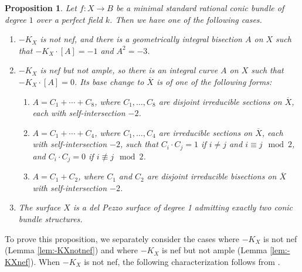 \documentclass[a4paper, 11pt, reqno]{amsart}
\numberwithin{equation}{section} \numberwithin{figure}{section}
\def \F {{\mathbb F}}
\def \P {{\mathbb P}}
\newcommand{\ra}{\rightarrow}
\newtheorem{lemma}{Lemma}
\newtheorem{proposition}[lemma]{Proposition}
\theoremstyle{definition}
\numberwithin{lemma}{section}
\begin{document}
\begin{proposition}\label{prop:classificationCB}
    Let $f \colon X \ra B$ be a minimal standard rational conic bundle of degree $1$ over a perfect field $k$. Then we have one of the following cases.
    \begin{enumerate}
        \item $-K_X$ is not nef, and there is a geometrically integral bisection $A$ on $X$ such that $-K_X \cdot [A] = -1$ and $A^2 = -3$.
        \item $-K_X$ is nef but not ample, so there is an integral curve $A$ on $X$ such that $-K_X \cdot [A] = 0$. Its base change to $\overline{X}$ is of one of the following forms:
        \begin{enumerate}
            \item $A = C_1 + \cdots + C_8$, where $C_1, \ldots, C_8$ are disjoint irreducible sections on $\overline{X}$, each with self-intersection $-2$.
        
            \item $A = C_1 + \cdots + C_4$, where $C_1, \ldots, C_4$ are irreducible sections on $\overline{X}$, each with self-intersection $-2$, such that $C_i \cdot C_j = 1$ if $i \neq j$ and $i \equiv j \mod 2$, and $C_i \cdot C_j = 0$ if $i \not \equiv j \mod 2$.

            \item $A = C_1 + C_2$, where $C_1$ and $C_2$ are disjoint irreducible bisections on $\overline{X}$ with self-intersection $-2$.
        \end{enumerate}
         \item The surface $X$ is a del Pezzo surface of degree 1 admitting exactly two conic bundle structures.
    \end{enumerate}
\end{proposition}

 To prove this proposition, we separately consider the cases where $-K_X$ is not nef (Lemma \ref{lem:-KXnotnef}) and where $-K_X$ is nef but not ample (Lemma \ref{lem:-KXnef}). When $-K_X$ is not nef, the following characterization follows from \cite[Lemma 19]{kollarmella}.

\end{document}
